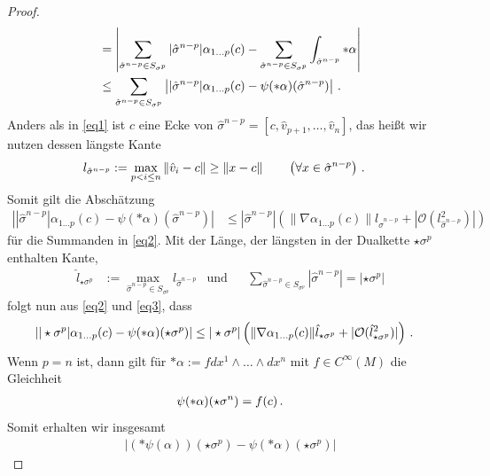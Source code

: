 \begin{proof}
\begin{align}
          &= \left| \sum_{\hat\sigma^{n-p}\in S_{\sigma^{p}}}|\hat\sigma^{n-p}|\alpha_{1 \ldots p}(c) 
                  - \sum_{\hat\sigma^{n-p}\in S_{\sigma^{p}}} \int_{\hat\sigma^{n-p}}*\alpha\right| \\
          &\le \sum_{\hat\sigma^{n-p}\in S_{\sigma^{p}}} \left||\hat\sigma^{n-p}|\alpha_{1 \ldots p}(c) - \psi(*\alpha)(\hat\sigma^{n-p}) \right| \,\text{.}\label{eq2}
    \end{align}
    Anders als in \eqref{eq1} ist \( c \) eine Ecke von \( \hat\sigma^{n-p}=\left[ c,\hat{v}_{p+1},\ldots,\hat{v}_{n} \right] \), das heißt wir nutzen dessen längste Kante 
    \begin{align}
      l_{\hat\sigma^{n-p}} &:= \max_{p < i \le n}\|\hat{v}_{i}-c\| \ge \|x-c\| \qquad\left( \forall x \in \hat\sigma^{n-p} \right) \,\text{.}
    \end{align}
    Somit gilt die Abschätzung
    \begin{align}
      \left||\hat\sigma^{n-p}|\alpha_{1 \ldots p}(c) - \psi(*\alpha)(\hat\sigma^{n-p}) \right|
        &\le |\hat\sigma^{n-p}| \left( \|\nabla\alpha_{1 \ldots p}(c)\| l_{\hat\sigma^{n-p}} + |\mathcal{O}(l_{\hat\sigma^{n-p}}^{2})| \right) \label{eq3}
    \end{align}
    für die Summanden in \eqref{eq2}.
    Mit der Länge, der längsten in der Dualkette \( \star\sigma^{p} \) enthalten Kante,
    \begin{align}
      \hat{l}_{\star\sigma^{p}} &:= \max_{\hat\sigma^{n-p}\in S_{\sigma^{p}}} l_{\hat\sigma^{n-p}} 
      &\text{und}&&
      \sum_{\hat\sigma^{n-p} \in S_{\sigma^{p}}} |\hat\sigma^{n-p}| = |\star\sigma^{p}|
    \end{align}
    folgt nun aus \eqref{eq2} und \eqref{eq3}, dass
    \begin{align}
       \left| |\star\sigma^{p}|\alpha_{1 \ldots p}(c) - \psi(*\alpha)(\star\sigma^{p})\right| 
         &\le |\star\sigma^{p}| \left( \|\nabla\alpha_{1 \ldots p}(c)\|\hat{l}_{\star\sigma^{p}}  + |\mathcal{O}(\hat{l}_{\star\sigma^{p}}^{2})| \right) \,\text{.}
    \end{align}
    Wenn \( p = n \) ist, dann gilt für \( *\alpha:= f  dx^{1}\wedge\ldots\wedge dx^{n} \) mit \( f \in C^{\infty}(M) \) die Gleichheit
    \begin{align}
      \psi(*\alpha)(\star\sigma^{n}) = f(c) \,\text{.}
    \end{align}
    Somit erhalten wir insgesamt
    \begin{align}
      \left| (*\psi(\alpha))(\star\sigma^{p}) - \psi(*\alpha)(\star\sigma^{p})\right|

\end{align}
\end{proof}
